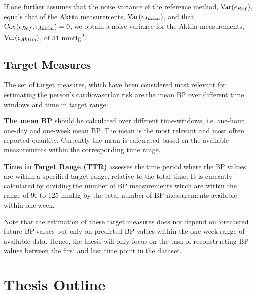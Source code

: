 If one further assumes that the noise variance of the reference method,
$\operatorname{Var}(\epsilon_{Ref})$, equals that of the Aktiia measurements, $\operatorname{Var}(\epsilon_{Aktiia})$,
and that $\operatorname{Cov}(\epsilon_{Ref}, \epsilon_{Aktiia})=0$, we obtain a noise variance
for the Aktiia measurements,
$\operatorname{Var}(\epsilon_{Aktiia})$, of 31 mmHg\textsuperscript{2}.


\subsection{Target Measures}\label{subsec:target-measures}
The set of target measures,
which have been considered most relevant for estimating the person’s cardiovascular risk are
the mean BP over different time windows and time in target range:

\textbf{The mean BP} should be calculated over different time-windows,
i.e. one-hour, one-day and one-week mean BP.
The mean is the most relevant and most often reported quantity.
Currently the mean is calculated based on the available measurements
within the corresponding time range.

\textbf{Time in Target Range (TTR)} assesses the time period where the
BP values are within a specified target range, relative to the total time.
It is currently calculated by dividing the number of BP measurements which are
within the range of 90 to 125 mmHg by the total number of BP measurements
available within one week.

Note that the estimation of these target measures does not depend on
forecasted future BP values but only on predicted BP values within the
one-week range of available data.
Hence, the thesis will only focus on the task of reconstructing BP values
between the first and last time point in the dataset.


\section{Thesis Outline}










